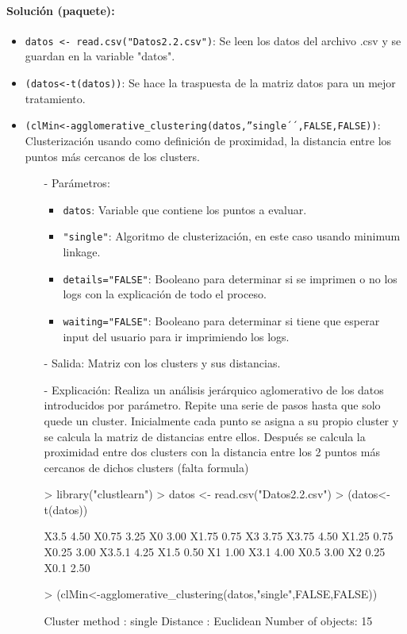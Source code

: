 \documentclass[a4paper, 12pt]{article}
\begin{document}
	\paragraph{Solución (paquete):}
	\begin{itemize}
		\item \texttt{datos <- read.csv("Datos2.2.csv")}: Se leen los datos del archivo .csv y se guardan en la variable "datos".
		\item \texttt{(datos<-t(datos))}: Se hace la traspuesta de la matriz datos para un mejor tratamiento.
		\item \texttt{(clMin<-agglomerative\_clustering(datos,''single´´,FALSE,FALSE))}: Clusterización usando como definición de proximidad, la distancia entre los puntos más cercanos de los clusters.
		\begin{itemize}
			\item [-] Parámetros:
			\begin{itemize}
				\item \texttt{datos}: Variable que contiene los puntos a evaluar.
				\item \texttt{"single"}: Algoritmo de clusterización, en este caso usando minimum linkage.
				\item \texttt{details="FALSE"}: Booleano para determinar si se imprimen o no los logs con la explicación de todo el proceso.
				\item \texttt{waiting="FALSE"}: Booleano para determinar si tiene que esperar input del usuario para ir imprimiendo los logs.
			\end{itemize}
			\item [-] Salida: Matriz con los clusters y sus distancias.
			\item [-] Explicación: Realiza un análisis jerárquico aglomerativo de los datos introducidos por parámetro. Repite una serie de pasos hasta que solo quede un cluster. Inicialmente cada punto se asigna a su propio cluster y se calcula la matriz de distancias entre ellos. Después se calcula la proximidad entre dos clusters con la distancia entre los 2 puntos más cercanos de dichos clusters (falta formula)
\begin{Schunk}
\begin{Sinput}
> library("clustlearn")
> datos <- read.csv("Datos2.2.csv")
> (datos<-t(datos))
\end{Sinput}
\begin{Soutput}
       [,1]
X3.5   4.50
X0.75  3.25
X0     3.00
X1.75  0.75
X3     3.75
X3.75  4.50
X1.25  0.75
X0.25  3.00
X3.5.1 4.25
X1.5   0.50
X1     1.00
X3.1   4.00
X0.5   3.00
X2     0.25
X0.1   2.50
\end{Soutput}
\begin{Sinput}
> (clMin<-agglomerative_clustering(datos,"single",FALSE,FALSE))
\end{Sinput}
\begin{Soutput}
Cluster method   : single 
Distance         : Euclidean 
Number of objects: 15 
\end{Soutput}
\end{Schunk}
		\end{itemize}
		

\end{itemize}
\end{document}
